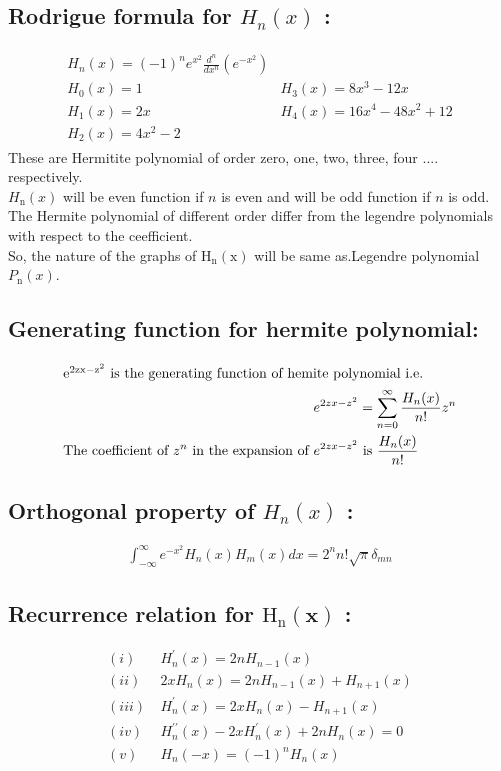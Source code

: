 \subsection{Rodrigue formula for $H_{n}(x)$ :}
\begin{align*}
\begin{array}{ll}
H_{n}(x)=(-1)^{n} e^{x^{2}} \frac{d^{n}}{d x^{n}}\left(e^{-x^{2}}\right) \\
H_{0}(x)=1 & H_{3}(x)=8 x^{3}-12 x \\
H_{1}(x)=2 x & H_{4}(x)=16 x^{4}-48 x^{2}+12 \\
H_{2}(x)=4 x^{2}-2 &
\end{array}
\end{align*}
These are Hermitite polynomial of order zero, one, two, three, four .... respectively. \\
$H_{\mathrm{n}}(x)$ will be even function if $n$ is even and will be odd function if $n$ is odd.\\
The Hermite polynomial of different order differ from the legendre polynomials with respect to the ceefficient.\\
 So, the nature of the graphs of $\mathrm{H}_{\mathrm{n}}(\mathrm{x})$ will be same as.Legendre polynomial $P_{\mathrm{n}}(x)$.
\subsection{Generating function for hermite polynomial:}
\begin{align*}
\intertext{$\mathrm{e}^{2 \mathrm{zx}-\mathrm{z}^{2}}$ is the generating function of hemite polynomial i.e.}
e^{2 z x-z^{2}}&=\sum_{n=0}^{\infty} \frac{H_{n}(x)}{n !} z^{n}\\
\text{The coefficient of $z^{n}$ in the expansion of }e^{2 z x-z^{2}}&\text{ is } \frac{H_{n}(x)}{n !}
\end{align*}
\subsection{Orthogonal property of $H_{n}(x)$ :}
\begin{align*}
\int_{-\infty}^{\infty} e^{-x^{2}} H_{n}(x) H_{m}(x) d x=2^{n} n ! \sqrt{\pi} \delta_{m n}
\end{align*}
\subsection{Recurrence relation for $\mathrm{H}_{\mathrm{n}}(\mathbf{x})$ :}
\begin{align*}
(i)&\  H_{n}^{\prime}(x)=2 n H_{n-1}(x)\\
(ii)& \ 2 x H_{n}(x)=2 n H_{n-1}(x)+H_{n+1}(x)\\
(iii)& \ H_{n}^{\prime}(x)=2 x H_{n}(x)-H_{n+1}(x)\\
(iv)&\  H_{n}^{\prime \prime}(x)-2 x H_{n}^{\prime}(x)+2 n H_{n}(x)=0\\
(v)&\  H_{n}(-x)=(-1)^{n} H_{n}(x)\\
\end{align*}

